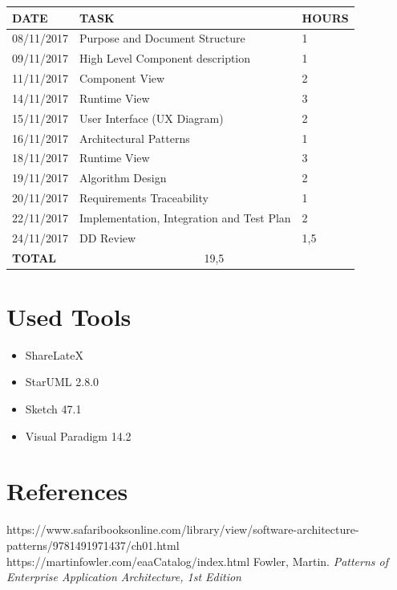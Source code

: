 \documentclass[12pt]{article}
\begin{document}
\begin{center}
\begin{tabular}{ |p{}|p{}|p{}| } 
 \hline
 \textbf{DATE} & \textbf{TASK} & \textbf{HOURS} \\ 
  \hline
 08/11/2017 & Purpose and Document Structure & 1 \\ 
  \hline
  09/11/2017 & High Level Component description & 1 \\ 
  \hline
  11/11/2017 & Component View & 2 \\ 
  \hline
  14/11/2017 & Runtime View & 3 \\ 
  \hline
  15/11/2017 & User Interface (UX Diagram) & 2 \\ 
  \hline
  16/11/2017 & Architectural Patterns & 1 \\
  \hline
  18/11/2017 & Runtime View & 3 \\
  \hline
  19/11/2017 & Algorithm Design & 2 \\
  \hline
  20/11/2017 & Requirements Traceability & 1 \\
  \hline
  22/11/2017 & Implementation, Integration and Test Plan & 2 \\
  \hline
  24/11/2017 & DD Review & 1,5 \\
  \hline
  \textbf{TOTAL} & \multicolumn{2}{c|}{19,5} \\ 
  \hline
\end{tabular}
\end{center}


\section{Used Tools}
\begin{itemize}
    \item ShareLateX
    \item StarUML 2.8.0
    \item Sketch 47.1
    \item Visual Paradigm 14.2
\end{itemize}

\section{References}

\begin{thebibliography}{9}
https://www.safaribooksonline.com/library/view/software-architecture-patterns/9781491971437/ch01.html
https://martinfowler.com/eaaCatalog/index.html
Fowler, Martin. \textit{Patterns of Enterprise Application Architecture, 1st Edition}

\end{thebibliography}
\end{document}
